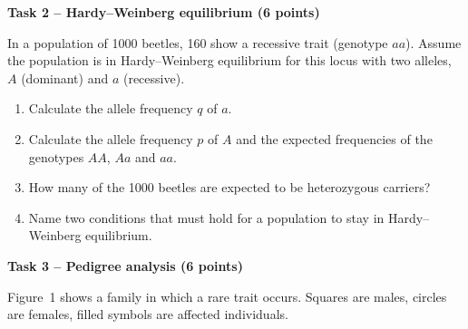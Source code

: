 \documentclass[11pt,a4paper]{article}
\newcommand{\task}[3]{\bigskip\par\noindent\textbf{Task #1 -- #2 (#3 points)}\par\nopagebreak\smallskip}
\begin{document}
\task{2}{Hardy--Weinberg equilibrium}{6}
In a population of 1000 beetles, 160 show a recessive trait (genotype $aa$). Assume the population is in
Hardy--Weinberg equilibrium for this locus with two alleles, $A$ (dominant) and $a$ (recessive).
\begin{enumerate}
  \item Calculate the allele frequency $q$ of $a$.
  \item Calculate the allele frequency $p$ of $A$ and the expected frequencies of the genotypes $AA$, $Aa$
        and $aa$.
  \item How many of the 1000 beetles are expected to be heterozygous carriers?
  \item Name two conditions that must hold for a population to stay in Hardy--Weinberg equilibrium.
\end{enumerate}

\task{3}{Pedigree analysis}{6}
Figure~1 shows a family in which a rare trait occurs. Squares are males, circles are females, filled
symbols are affected individuals.
\end{document}
